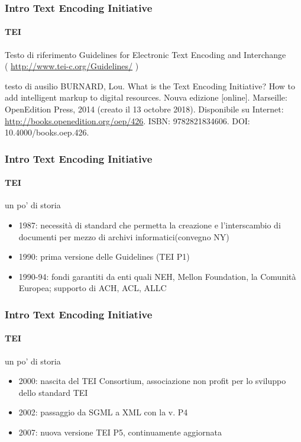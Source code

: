 \begin{frame}
	\frametitle{Intro Text Encoding Initiative}
	\framesubtitle{TEI}
	\addtocounter{nframe}{1}

	\begin{block}{Testo di riferimento}
        Guidelines for Electronic Text Encoding and Interchange 
        \\( \url{http://www.tei-c.org/Guidelines/} )
	\end{block}

	\begin{block}{testo di ausilio}
		BURNARD, Lou. What is the Text Encoding Initiative? How to add intelligent markup to digital resources. Nouva edizione [online]. Marseille: OpenEdition Press, 2014 (creato il 13 octobre 2018). Disponibile su Internet: \url{http://books.openedition.org/oep/426}. ISBN: 9782821834606. DOI: 10.4000/books.oep.426.

	\end{block}
\end{frame}


\begin{frame}
	\frametitle{Intro Text Encoding Initiative}
	\framesubtitle{TEI}
	\addtocounter{nframe}{1}

	\begin{block}{un po' di storia}
		\begin{itemize}
			\item 1987: necessità di standard che permetta la creazione e l’interscambio di documenti per mezzo di archivi informatici(convegno NY)
			\item 1990: prima versione delle Guidelines (TEI P1)
			\item 1990-94: fondi garantiti da enti quali NEH, Mellon Foundation, la Comunità Europea; supporto di ACH, ACL, ALLC
		\end{itemize}
	\end{block}

\end{frame}

\begin{frame}
	\frametitle{Intro Text Encoding Initiative}
	\framesubtitle{TEI}
	\addtocounter{nframe}{1}

	\begin{block}{un po' di storia}
		\begin{itemize}
			\item 2000: nascita del TEI Consortium, associazione non profit per lo sviluppo dello standard TEI
			\item 2002: passaggio da SGML a XML con la v. P4
			\item 2007: nuova versione TEI P5, continuamente aggiornata
		\end{itemize}
	\end{block}

\end{frame}


